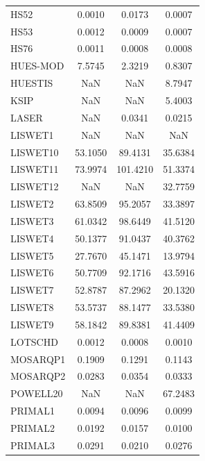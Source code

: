 \begin{longtable}{lccc}
HS52     &        0.0010 &        0.0173 &        0.0007 \\
HS53     &        0.0012 &        0.0009 &        0.0007 \\
HS76     &        0.0011 &        0.0008 &        0.0008 \\
HUES-MOD &        7.5745 &        2.3219 &        0.8307 \\
HUESTIS  &           NaN &           NaN &        8.7947 \\
KSIP     &           NaN &           NaN &        5.4003 \\
LASER    &           NaN &        0.0341 &        0.0215 \\
LISWET1  &           NaN &           NaN &           NaN \\
LISWET10 &       53.1050 &       89.4131 &       35.6384 \\
LISWET11 &       73.9974 &      101.4210 &       51.3374 \\
LISWET12 &           NaN &           NaN &       32.7759 \\
LISWET2  &       63.8509 &       95.2057 &       33.3897 \\
LISWET3  &       61.0342 &       98.6449 &       41.5120 \\
LISWET4  &       50.1377 &       91.0437 &       40.3762 \\
LISWET5  &       27.7670 &       45.1471 &       13.9794 \\
LISWET6  &       50.7709 &       92.1716 &       43.5916 \\
LISWET7  &       52.8787 &       87.2962 &       20.1320 \\
LISWET8  &       53.5737 &       88.1477 &       33.5380 \\
LISWET9  &       58.1842 &       89.8381 &       41.4409 \\
LOTSCHD  &        0.0012 &        0.0008 &        0.0010 \\
MOSARQP1 &        0.1909 &        0.1291 &        0.1143 \\
MOSARQP2 &        0.0283 &        0.0354 &        0.0333 \\
POWELL20 &           NaN &           NaN &       67.2483 \\
PRIMAL1  &        0.0094 &        0.0096 &        0.0099 \\
PRIMAL2  &        0.0192 &        0.0157 &        0.0100 \\
PRIMAL3  &        0.0291 &        0.0210 &        0.0276 \\

\end{longtable}
